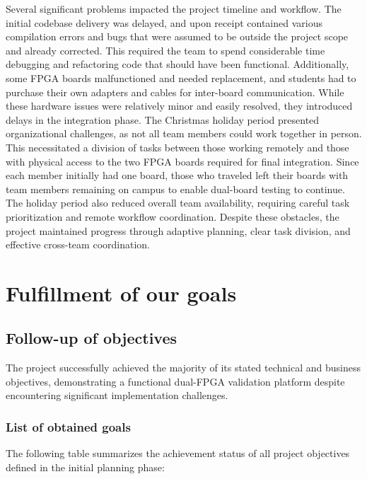 \documentclass[10pt]{article}
\begin{document}
Several significant problems impacted the project timeline and workflow. The initial codebase delivery was delayed, and upon receipt contained various compilation errors and bugs that were assumed to be outside the project scope and already corrected. This required the team to spend considerable time debugging and refactoring code that should have been functional. Additionally, some FPGA boards malfunctioned and needed replacement, and students had to purchase their own adapters and cables for inter-board communication. While these hardware issues were relatively minor and easily resolved, they introduced delays in the integration phase. The Christmas holiday period presented organizational challenges, as not all team members could work together in person. This necessitated a division of tasks between those working remotely and those with physical access to the two FPGA boards required for final integration. Since each member initially had one board, those who traveled left their boards with team members remaining on campus to enable dual-board testing to continue. The holiday period also reduced overall team availability, requiring careful task prioritization and remote workflow coordination. Despite these obstacles, the project maintained progress through adaptive planning, clear task division, and effective cross-team coordination.

\section{Fulfillment of our goals}

\subsection{Follow-up of objectives}

The project successfully achieved the majority of its stated technical and business objectives, demonstrating a functional dual-FPGA validation platform despite encountering significant implementation challenges.

\subsubsection{List of obtained goals}

The following table summarizes the achievement status of all project objectives defined in the initial planning phase:
\end{document}
